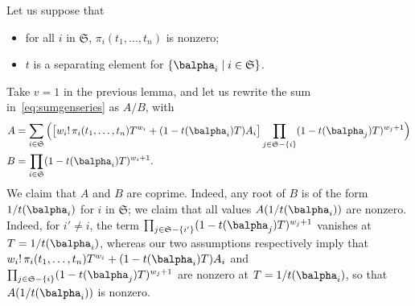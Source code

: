 \documentclass[12pt]{article}
\begin{document}
\noindent Let us suppose that
\begin{itemize}
\item for all $i$ in $\mathfrak{S}$,  $ \pi_i(t_1,\dots,t_n)$ is nonzero;
\item $t$ is a separating element for $ \{\balpha_i \mid i \in \mathfrak{S}\}$.
\end{itemize}
Take $v=1$ in the previous lemma, and
let us rewrite the sum in~\eqref{eq:sumgenseries} as $A/B$, with
\begin{align*}
  A&=\sum_{i \in \mathfrak{S}} \Big(\big[
 w_i!\, \pi_{i}(t_1,\dots,t_n)
  T^{w_i} + (1-t(\balpha_i)    T)A_i\big]
\prod_{j \in \mathfrak{S}-\{i\}}(1-t(\balpha_j) T)^{w_{j}+1}\Big)
\\
B&=\prod_{i \in \mathfrak{S}}(1-t(\balpha_i) T)^{w_{i}+1}.
\end{align*}
We claim that $A$ and $B$ are coprime. Indeed, any root of $B$ is of
the form $1/t(\balpha_i)$ for $i$ in $\mathfrak{S}$; we claim that all
values $A(1/t(\balpha_i))$ are nonzero. Indeed, for $i' \ne i$, the
term $\prod_{j \in \mathfrak{S}-\{i'\}}(1-t(\balpha_j) T)^{w_{j}+1}$
vanishes at $T=1/t(\balpha_i)$, whereas our two assumptions
respectively imply that $ w_i!\, \pi_{i}(t_1,\dots,t_n)
T^{w_i} + (1-t(\balpha_i) T)A_i$ and $\prod_{j \in
  \mathfrak{S}-\{i\}}(1-t(\balpha_j) T)^{w_{j}+1}$
are nonzero at  $T=1/t(\balpha_i)$, so that $A(1/t(\balpha_i))$ is nonzero.
\end{document}
